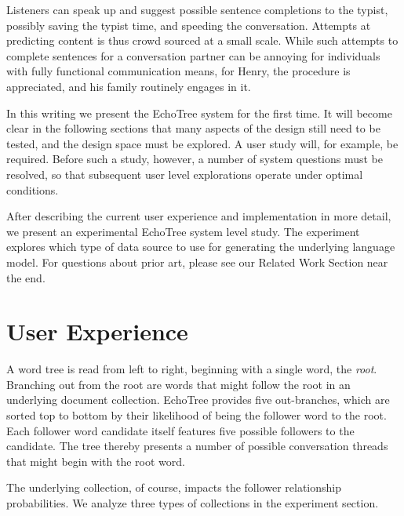 \documentclass{sigchi}
\begin{document}
Listeners can speak up and suggest possible sentence completions to
the typist, possibly saving the typist time, and speeding the
conversation. Attempts at predicting content is thus crowd sourced at
a small scale. While such attempts to complete sentences for a
conversation partner can be annoying for individuals with fully
functional communication means, for Henry, the procedure is
appreciated, and his family routinely engages in it.

In this writing we present the EchoTree system for the first time. It
will become clear in the following sections that many aspects of the
design still need to be tested, and the design space must be
explored. A user study will, for example, be required. Before such a
study, however, a number of system questions must be resolved, so that
subsequent user level explorations operate under optimal conditions.

After describing the current user experience and implementation in
more detail, we present an experimental EchoTree system level
study. The experiment explores which type of data source to use for
generating the underlying language model. For questions about prior
art, please see our Related Work Section near the end.

\section{User Experience}
A word tree\cite{Wattenberg2008} is read from left to right, beginning
with a single word, the {\em root}. Branching out from the root are
words that might follow the root in an underlying document
collection. EchoTree provides five out-branches, which are sorted top
to bottom by their likelihood of being the follower word to the
root. Each follower word candidate itself features five possible
followers to the candidate.  The tree thereby presents a number of
possible conversation threads that might begin with the root word.

The underlying collection, of course, impacts the follower
relationship probabilities. We analyze three types of collections in
the experiment section.
\end{document}
